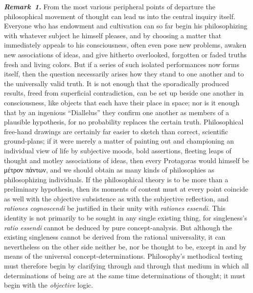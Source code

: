 \documentclass[12pt]{book}
\newcommand{\anm}[1]{\emph{\textbf{Remark~#1.}}}
\begin{document}
\anm{1} From the most various peripheral points of departure the
philosophical movement of thought can lead us into the central inquiry
itself. Everyone who has endowment and cultivation can so far begin his
philosophizing with whatever subject he himself pleases, and by choosing a
matter that immediately appeals to his consciousness, often even pose new
problems, awaken new associations of ideas, and give hitherto overlooked,
forgotten or faded truths fresh and living colors. But if a series of such
isolated performances now forms itself, then the question necessarily arises
how they stand to one another and to the universally valid truth. It is not
enough that the sporadically produced results, freed from superficial
contradiction, can be set up beside one another in consciousness, like
objects that each have their place in space; nor is it enough that by an
ingenious ``Diallelus'' they confirm one another as members of a plausible
hypothesis, for no probability replaces the certain truth. Philosophical
free-hand drawings are certainly far easier to sketch than correct,
scientific ground-plans; if it were merely a matter of painting out and
championing an individual view of life by subjective moods, bold assertions,
fleeting leaps of thought and motley associations of ideas, then every
Protagoras would himself be μέτρον πάντων, and we should obtain as many
kinds of philosophies as philosophizing individuals. If the philosophical
theory is to be more than a preliminary hypothesis, then its moments of
content must at every point coincide as well with the objective subsistence
as with the subjective reflection, and \textit{rationes cognoscendi} be
justified in their unity with \textit{rationes essendi}. This identity is
not primarily to be sought in any single existing thing, for singleness's
\textit{ratio essendi} cannot be deduced by pure concept-analysis. But
although the existing singleness cannot be derived from the rational
universality, it can nevertheless on the other side neither be, nor be
thought to be, except in and by means of the universal
concept-determinations. Philosophy's methodical testing must therefore begin
by clarifying through and through that medium in which all determinations of
being are at the same time determinations of thought; it must begin with the
\emph{objective} logic.
\end{document}
